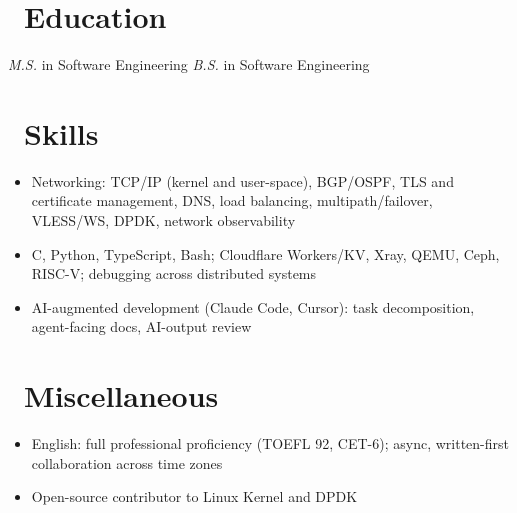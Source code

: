 \documentclass{resume}
\begin{document}
\section{\faGraduationCap\ Education}
\textit{M.S.} in Software Engineering
\textit{B.S.} in Software Engineering

\section{\faWrench\ Skills}
\begin{itemize}[parsep=0.5ex]
  \item Networking: TCP/IP (kernel and user-space), BGP/OSPF, TLS and certificate management, DNS, load balancing, multipath/failover, VLESS/WS, DPDK, network observability
  \item C, Python, TypeScript, Bash; Cloudflare Workers/KV, Xray, QEMU, Ceph, RISC-V; debugging across distributed systems
  \item AI-augmented development (Claude Code, Cursor): task decomposition, agent-facing docs, AI-output review
\end{itemize}

\section{\faGlobe\ Miscellaneous}
\begin{itemize}[parsep=0.5ex]
  \item English: full professional proficiency (TOEFL 92, CET-6); async, written-first collaboration across time zones
  \item Open-source contributor to Linux Kernel and DPDK
\end{itemize}
\end{document}
